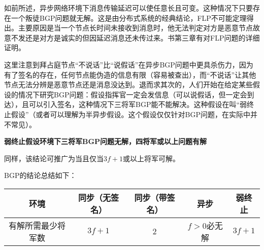 如前所述，异步网络环境下消息传输延迟可以使任意长且可变。这种情况下只要存在一个叛徒BGP问题就无解。这是由分布式系统的经典结论，FLP不可能定理得出\cite{fischer1982impossibility}。主要原因是当一个节点长时间未接收到消息时，他无法判定对方是恶意节点故意不发还是对方是诚实的但因延迟消息还未传过来。书\cite{wattenhofer2016science}第三章有对FLP问题的详细证明。	

这里注意到拜占庭节点“不说话”比“说假话”在异步BGP问题中更具杀伤力，因为有了签名的存在，任何节点能伪造的信息有限（容易被查出），而“不说话”让其他节点无法分辨是恶意节点还是消息没达到。退而求其次的，人们开始在给定某些假设的情况下研究BGP问题：假设指挥官一定会发信息（可以说假话，但一定会到达），且可以引入签名，这种情况下三将军BGP能不能解决。这种假设在\cite{zhihuBFT}叫“弱终止假设”（或者可以理解为半异步假设。这个假设仅仅针对BGP问题，在实际中并不常见）。

\textbf{弱终止假设环境下三将军BGP问题无解，四将军或以上问题有解}

同样，该结论可推广为当且仅当$3f+1$或以上将军可解。

BGP的结论总结如下：

\begin{tabular}{|c|c|c|c|c|}
环境	& 同步（无签名）& 同步（带签名）& 异步  & 弱终止 \\\hline
有解所需最少将军数 &  $3f+1$ &   2   &   $f>0$必无解  &    $3f+1$ \\    
\end{tabular}
